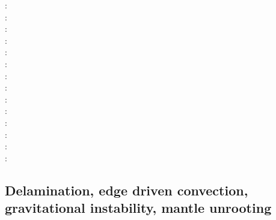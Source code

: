\begin{scriptsize}
\twothousandseven: \cite{afrf07}\cite{kore07}\cite{gewm07}\cite{jabn07}\\
\twothousandeight: \cite{affr08}\cite{tibb08}\cite{hapo08}\cite{busc08}\cite{clbz08}\cite{chlg08}
      \cite{kasb08}\cite{fabs08}\cite{chgu08}\cite{buit08}\cite{onlg08}\\
\twothousandnine: \cite{bupb09}\cite{plmg09}\cite{rigo09}\cite{bubg09}\cite{coco09}\\
\twothousandten: \cite{hamo10}\cite{fasm10}\cite{grpy10}\cite{vago10}\cite{plmf10}\cite{spgs10a}\cite{pygp10}
      \cite{jabw10}\\
\twothousandeleven: \cite{rera11}\cite{chss11}\\
\twothousandtwelve: \cite{wagw12}\cite{vacl12}\cite{buit12}\cite{kogp12}\cite{gohg12}\cite{trub12}\\
\twothousandthirteen: \cite{wazh13}\cite{krcu13}\cite{frbm13}\cite{wagw13}\cite{duyp13}\cite{rugb13} \cite{scdg13}\\
\twothousandfourteen: \cite{kava14}\cite{dusp14}\cite{wavp14}\cite{whbb14}\cite{scml14}
      \cite{mals14}\cite{gupm14}\cite{gahs14}\cite{mutg14}\\
\twothousandfifteen: \cite{wavp15}\cite{thkp15}\cite{mags15}\cite{duys15}\cite{dusp15}\\
\twothousandsixteen: \cite{wahz16}\\
\twothousandseventeen: \cite{rugb17}\cite{ozgw17}\cite{vomc17}\cite{taac17}\cite{ithc17}\\
\twothousandeighteen: \cite{wavp18}\cite{nigw18}\cite{bemc18}\cite{neew18}\\
\twothousandnineteen: \cite{koen19}\cite{kipd19}\cite{crcm19}\cite{pedm19}\cite{mazz19}\cite{chch19}\\
\twothousandtwenty: \cite{yamq20}
\end{scriptsize}


\subsection{Delamination, edge driven convection, gravitational instability, mantle unrooting} 

